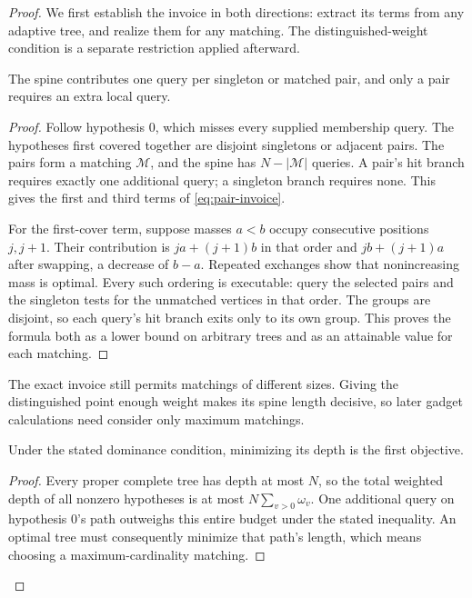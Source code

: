 \begin{proof}
We first establish the invoice in both directions: extract its
terms from any adaptive tree, and realize them for any matching.
The distinguished-weight condition is a separate restriction applied
afterward.

\begin{claim}
\label{clm:pair-invoice-attainable}
The spine contributes one query per singleton or matched pair, and
only a pair requires an extra local query.
\end{claim}
\begin{proof}
Follow hypothesis $0$, which misses every supplied membership query.
The hypotheses first covered together are disjoint singletons
or adjacent pairs. The pairs form a matching $\mathcal M$,
and the spine has $N-|\mathcal M|$ queries.
A pair's hit branch requires exactly one additional query;
a singleton branch requires none.
This gives the first and third terms of \eqref{eq:pair-invoice}.

For the first-cover term, suppose masses $a<b$ occupy consecutive
positions $j,j+1$. Their contribution is
$ja+(j+1)b$ in that order and $jb+(j+1)a$ after swapping, a decrease
of $b-a$. Repeated exchanges show that nonincreasing mass is optimal.
Every such ordering is executable: query the selected pairs
and the singleton tests for the unmatched vertices in that order.
The groups are disjoint, so each query's hit branch exits only
to its own group. This proves the
formula both as a lower bound on arbitrary trees and as an
attainable value for each matching.
\end{proof}

The exact invoice still permits matchings of different sizes. Giving
the distinguished point enough weight makes its spine length decisive,
so later gadget calculations need consider only maximum matchings.

\begin{claim}
\label{clm:pair-invoice-cardinality}
Under the stated dominance condition, minimizing its depth is the
first objective.
\end{claim}
\begin{proof}

Every proper complete tree has depth at most $N$, so the total
weighted depth of all nonzero hypotheses is at most
$N\sum_{v>0}\omega_v$. One additional query on hypothesis $0$'s
path outweighs this entire budget under the stated inequality.
An optimal tree must consequently minimize that path's length,
which means choosing a maximum-cardinality matching.
\end{proof}
\end{proof}

